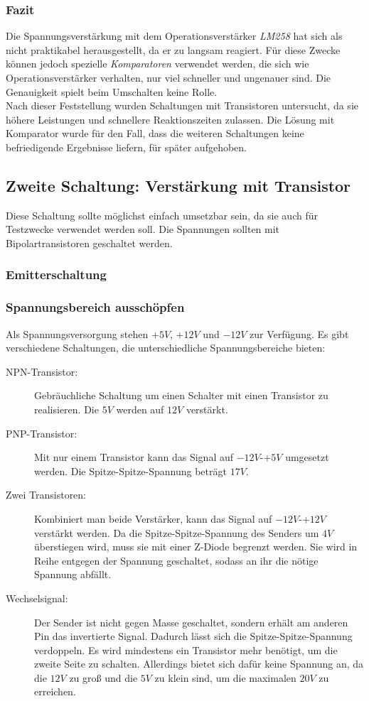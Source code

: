 \subsubsection{Fazit}
Die Spannungsverstärkung mit dem Operationsverstärker \textit{LM258} hat sich als nicht praktikabel herausgestellt, da er zu langsam reagiert. Für diese Zwecke können jedoch spezielle \textit{Komparatoren} verwendet werden, die sich wie Operationsverstärker verhalten, nur viel schneller und ungenauer sind. Die Genauigkeit spielt beim Umschalten keine Rolle.\\
Nach dieser Feststellung wurden Schaltungen mit Transistoren untersucht, da sie höhere Leistungen und schnellere Reaktionszeiten zulassen. Die Lösung mit Komparator wurde für den Fall, dass die weiteren Schaltungen keine befriedigende Ergebnisse liefern, für später aufgehoben.


\subsection{Zweite Schaltung: Verstärkung mit Transistor}
Diese Schaltung sollte möglichst einfach umsetzbar sein, da sie auch für Testzwecke verwendet werden soll. Die Spannungen sollten mit Bipolartransistoren geschaltet werden.

\subsubsection{Emitterschaltung}


\subsubsection{Spannungsbereich ausschöpfen}
Als Spannungsversorgung stehen $+5V$, $+12V$ und $-12V$ zur Verfügung. Es gibt verschiedene Schaltungen, die unterschiedliche Spannungsbereiche bieten:
\begin{description}
	\item[NPN-Transistor:] Gebräuchliche Schaltung um einen Schalter mit einen Transistor zu realisieren. Die $5V$ werden auf $12V$ verstärkt.
	\item[PNP-Transistor:] Mit nur einem Transistor kann das Signal auf $-12V$-$+5V$ umgesetzt werden. Die Spitze-Spitze-Spannung beträgt $17V$.
	\item[Zwei Transistoren:] Kombiniert man beide Verstärker, kann das Signal auf $-12V$-$+12V$ verstärkt werden. Da die Spitze-Spitze-Spannung des Senders um $4V$ überstiegen wird, muss sie mit einer Z-Diode begrenzt werden. Sie wird in Reihe entgegen der Spannung geschaltet, sodass an ihr die nötige Spannung abfällt.
	\item[Wechselsignal:] Der Sender ist nicht gegen Masse geschaltet, sondern erhält am anderen Pin das invertierte Signal. Dadurch lässt sich die Spitze-Spitze-Spannung verdoppeln. Es wird mindestens ein Transistor mehr benötigt, um die zweite Seite zu schalten. Allerdings bietet sich dafür keine Spannung an, da die $12V$ zu groß und die $5V$ zu klein sind, um die maximalen $20V$ zu erreichen.
\end{description}

